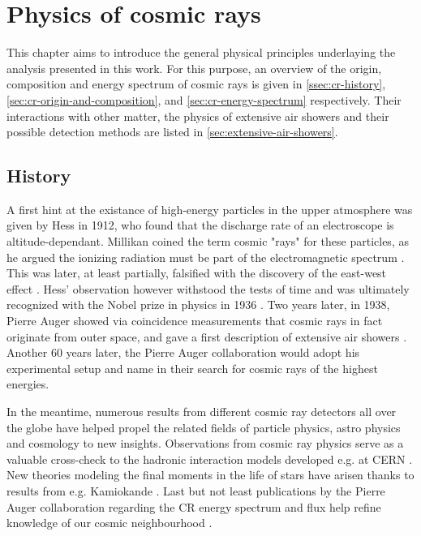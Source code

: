 
\chapter{Physics of cosmic rays}
\label{chap:physical-background}

This chapter aims to introduce the general physical principles underlaying the analysis presented in this work. For this purpose, an overview of the origin, 
composition and energy spectrum of cosmic rays is given in \autoref{ssec:cr-history}, \autoref{sec:cr-origin-and-composition}, and \autoref{sec:cr-energy-spectrum}
respectively. Their interactions with other matter, the physics of extensive air showers and their possible detection methods are listed in 
\autoref{sec:extensive-air-showers}.

\section{History}
\label{ssec:cr-history}

A first hint at the existance of high-energy particles in the upper atmosphere was given by Hess in 1912, who found that the discharge rate of an electroscope is 
altitude-dependant. Millikan coined the term cosmic "rays" for these particles, as he argued the ionizing radiation must be part of the electromagnetic spectrum 
\cite{millikan1928origin}. This was later, at least partially, falsified with the discovery of the east-west effect \cite{johnson1938note}. Hess' observation 
however withstood the tests of time and was ultimately recognized with the Nobel prize in physics in 1936 \cite{nobelprize1936}. Two years later, in 1938, Pierre 
Auger showed via coincidence measurements that cosmic rays in fact originate from outer space, and gave a first description of extensive air showers 
\cite{auger1939extensive}. Another 60 years later, the Pierre Auger collaboration would adopt his experimental setup and name in their search for cosmic rays of 
the highest energies.

In the meantime, numerous results from different cosmic ray detectors all over the globe have helped propel the related fields of particle physics, astro physics 
and cosmology to new insights. Observations from cosmic ray physics serve as a valuable cross-check to the hadronic interaction models developed e.g. at CERN 
\cite{ostapchenko2007status}. New theories modeling the final moments in the life of stars have arisen thanks to results from e.g. Kamiokande 
\cite{goldman1988implications}. Last but not least publications by the Pierre Auger collaboration regarding the CR energy spectrum and flux help refine knowledge of 
our cosmic neighbourhood \cite{abraham2010measurement, aab2015searches}.

